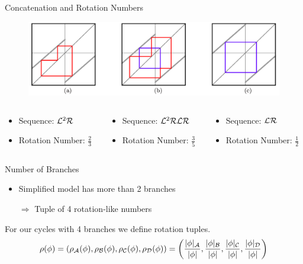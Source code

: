 \begin{frame}{Concatenation and Rotation Numbers}
	\begin{figure}
		\includegraphics[width=.8 \textwidth]{Figs/PeriodAddingCobwebs_Slides.png}
	\end{figure}
	\begin{columns}
		\begin{column}{.3 \textwidth}
			\begin{itemize}
				\item Sequence: $\mathcal{L}^2\mathcal{R}$
				\item Rotation Number: $\frac{2}{3}$
			\end{itemize}
		\end{column}
		\begin{column}{.3 \textwidth}
			\begin{itemize}
				\item Sequence: $\mathcal{L}^2\mathcal{R}\mathcal{L}\mathcal{R}$
				\item Rotation Number: $\frac{3}{5}$
			\end{itemize}
		\end{column}
		\begin{column}{.3 \textwidth}
			\begin{itemize}
				\item Sequence: $\mathcal{L}\mathcal{R}$
				\item Rotation Number: $\frac{1}{2}$
			\end{itemize}
		\end{column}
	\end{columns}
\end{frame}

\begin{frame}{Number of Branches}
	\begin{itemize}
		\item Simplified model has more than 2 branches
		      \pause
		\item[$\Rightarrow$] Tuple of 4 rotation-like numbers
	\end{itemize}
	\begin{definition}
		For our cycles with 4 branches we define rotation tuples.
		\begin{align*}
			\rho(\phi)
			= (\rho_{\mathcal{A}}(\phi), \rho_{\mathcal{B}}(\phi), \rho_{\mathcal{C}}(\phi), \rho_{\mathcal{D}}(\phi))
			= \left(\frac{|\phi|_{\mathcal{A}}}{|\phi|}, \frac{|\phi|_{\mathcal{B}}}{|\phi|}, \frac{|\phi|_{\mathcal{C}}}{|\phi|}, \frac{|\phi|_{\mathcal{D}}}{|\phi|}\right)
		\end{align*}
	\end{definition}
\end{frame}

